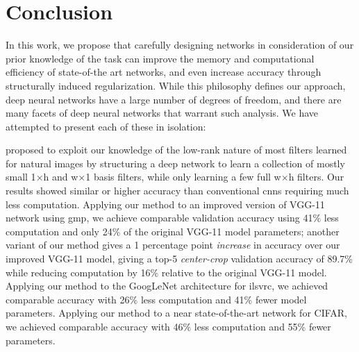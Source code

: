 \documentclass[thesis]{subfiles}
\begin{document}

\chapter{Conclusion}
\label{conclusion}
In this work, we propose that carefully designing networks in consideration of our prior knowledge of the task can improve the memory and computational efficiency of state-of-the art networks, and even increase accuracy through structurally induced regularization. While this philosophy defines our approach, deep neural networks have a large number of degrees of freedom, and there are many facets of deep neural networks that warrant such analysis. We have attempted to present each of these in isolation:

 proposed to exploit our knowledge of the low-rank nature of most filters learned for natural images by structuring a deep network to learn a collection of mostly small 1$\times$h and w$\times$1 basis filters, while only learning a few full w$\times$h filters. Our results showed similar or higher accuracy than conventional \glspl{cnn} requiring much less computation. Applying our method to an improved version of VGG-11 network using \gls{gmp}, we achieve comparable validation accuracy using 41\% less computation and only 24\% of the original VGG-11 model parameters; another variant of our method gives a 1 percentage point {\em increase} in accuracy over our improved VGG-11 model, giving a top-5 \emph{center-crop} validation accuracy of 89.7\% while reducing computation by 16\% relative to the original VGG-11 model. Applying our method to the GoogLeNet architecture for \gls{ilsvrc}, we achieved comparable accuracy with 26\% less computation and 41\% fewer model parameters. Applying our method to a near state-of-the-art network for CIFAR, we achieved comparable accuracy with 46\% less computation and 55\% fewer parameters. 
	
\end{document}
